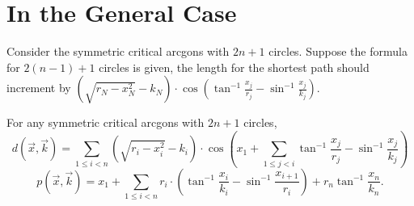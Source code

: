 \section{In the General Case}
	Consider the symmetric critical arcgons with $2n+1$ circles. Suppose the formula for $2(n-1)+1$ circles is given, the length for the shortest path should increment by $(\sqrt{r_N- x_N^2} - k_N)\cdot\cos(\tan^{-1}{\frac{x_j}{r_j}}-  \sin^{-1}{\frac{x_j}{k_j}}) $.

	For any symmetric critical arcgons with $2n + 1$ circles, 
	\[d(\vec{x}, \vec{k}) = \sum_{1\le i< n}\left(\sqrt{r_i- x_i^2} - k_i\right)\cdot\cos\left({x_1 +\sum_{1\le j< i} \tan^{-1}{\frac{x_j}{r_j}}-  \sin^{-1}{\frac{x_j}{k_j}}}\right) \]
	\[p(\vec{x}, \vec{k}) = x_1 + \sum_{1\le i< n}r_i\cdot(\tan^{-1}{\frac{x_i}{k_i}}- \sin^{-1}{\frac{x_{i+1}}{r_i}}) + r_n\tan^{-1}{\frac{x_n}{k_n}}.\]